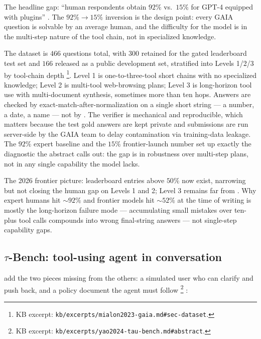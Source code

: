 The headline gap: ``human respondents obtain
$92\%$ vs.\ $15\%$ for GPT-4 equipped with plugins''
\citep[\S{}abstract]{mialon2023-gaia}. The $92\% \to 15\%$ inversion
is the design point: every GAIA question is solvable by an average
human, and the difficulty for the model is in the multi-step nature
of the tool chain, not in specialized knowledge.

The dataset is $466$ questions total, with $300$ retained for the
gated leaderboard test set and $166$ released as a public development
set, stratified into Levels 1/2/3 by tool-chain depth%
\footnote{KB excerpt: \nolinkurl{kb/excerpts/mialon2023-gaia.md#sec-dataset}.}.
Level 1 is one-to-three-tool short chains with no specialized
knowledge; Level 2 is multi-tool web-browsing plans; Level 3 is
long-horizon tool use with multi-document synthesis, sometimes more
than ten hops. Answers are checked by exact-match-after-normalization
on a single short string --- a number, a date, a name --- not by
. The verifier is mechanical and reproducible, which
matters because the test gold answers are kept private and submissions
are run server-side by the GAIA team to delay contamination via
training-data leakage. The $92\%$ expert baseline and the $15\%$
frontier-launch number set up exactly the diagnostic the abstract
calls out: the gap is in robustness over multi-step plans, not in
any single capability the model lacks.

The 2026 frontier picture: leaderboard entries above $50\%$ now exist,
narrowing but not closing the human gap on Levels 1 and 2; Level 3
remains far from . Why expert humans hit $\sim 92\%$ and
frontier models hit $\sim 52\%$ at the time of writing is mostly
the long-horizon failure mode --- accumulating small mistakes over
ten-plus tool calls compounds into wrong final-string answers --- not
single-step capability gaps.

\subsection{$\tau$-Bench: tool-using agent in conversation}
\label{sec:agentic-tau-bench}

\citet{yao2024-tau-bench} add the two pieces missing from the others:
a simulated user who can clarify and push back, and a policy document
the agent must follow%
\footnote{KB excerpt: \nolinkurl{kb/excerpts/yao2024-tau-bench.md#abstract}.}
\citep[\S{}abstract]{yao2024-tau-bench}:

